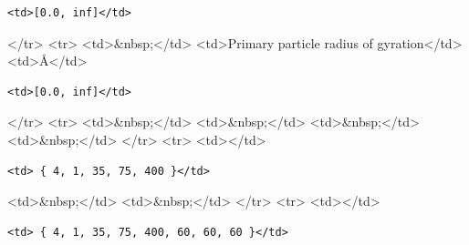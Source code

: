 \begin{verbatim}
<td>[0.0, inf]</td>
\end{verbatim}

\textless{}/tr\textgreater{} \textless{}tr\textgreater{} \textless{}td\textgreater{}\&nbsp;\textless{}/td\textgreater{} \textless{}td\textgreater{}Primary particle radius of gyration\textless{}/td\textgreater{} \textless{}td\textgreater{}\AA{}\textless{}/td\textgreater{}

\begin{verbatim}
<td>[0.0, inf]</td>
\end{verbatim}

\textless{}/tr\textgreater{} \textless{}tr\textgreater{} \textless{}td\textgreater{}\&nbsp;\textless{}/td\textgreater{} \textless{}td\textgreater{}\&nbsp;\textless{}/td\textgreater{} \textless{}td\textgreater{}\&nbsp;\textless{}/td\textgreater{} \textless{}td\textgreater{}\&nbsp;\textless{}/td\textgreater{} \textless{}/tr\textgreater{} \textless{}tr\textgreater{} \textless{}td\textgreater{}\textless{}/td\textgreater{}

\begin{verbatim}
<td> { 4, 1, 35, 75, 400 }</td>
\end{verbatim}

\textless{}td\textgreater{}\&nbsp;\textless{}/td\textgreater{} \textless{}td\textgreater{}\&nbsp;\textless{}/td\textgreater{} \textless{}/tr\textgreater{} \textless{}tr\textgreater{} \textless{}td\textgreater{}\textless{}/td\textgreater{}

\begin{verbatim}
<td> { 4, 1, 35, 75, 400, 60, 60, 60 }</td>
\end{verbatim}

